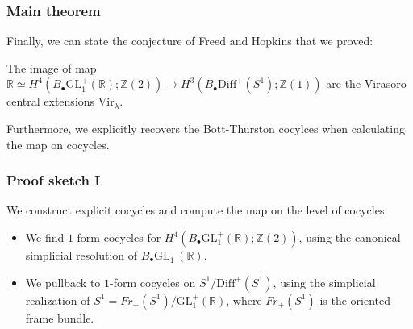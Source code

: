 \documentclass{beamer}
\newcommand{\Z}{\mathbb Z}
\newcommand{\R}{\mathbb R}
\newcommand{\GL}{\mathrm{GL}}
\newcommand{\Bdot}{B_\bullet}
\newcommand{\Diff}{\mathrm{Diff}^+(S^1)}
\newcommand{\Vir}{\mathrm{Vir}}
\begin{document}
\begin{frame}
    \frametitle{Main theorem}
    Finally, we can state the conjecture of Freed and Hopkins that we proved: \vspace{5mm}
    \begin{theorem}
        The image of map $\R \simeq H^4(\Bdot \GL^+_1(\R); \Z(2)) \to H^3(\Bdot\Diff; \Z(1))$
        are the Virasoro central extensions $\Vir_\lambda$.
    \end{theorem}

    \vspace{5mm} Furthermore, we explicitly recovers the Bott-Thurston cocylces when calculating the 
    map on cocycles.
\end{frame}

\begin{frame}
    \frametitle{Proof sketch I}
    We construct explicit cocycles and compute the map on the 
    level of cocycles.
    \begin{itemize}
        \item <1 -> We find $1$-form cocycles for $H^4(\Bdot \GL^+_1(\R); \Z(2))$, 
        using the canonical simplicial resolution of $\Bdot \GL^+_1(\R)$.
        \item <2 -> We pullback to  $1$-form cocycles on $S^1/\Diff$, using the simplicial 
        realization of $S^1 = Fr_+(S^1)/\GL^+_1(\R)$, where $Fr_+(S^1)$ is the oriented frame bundle.
    \end{itemize}
\end{frame}
\end{document}

